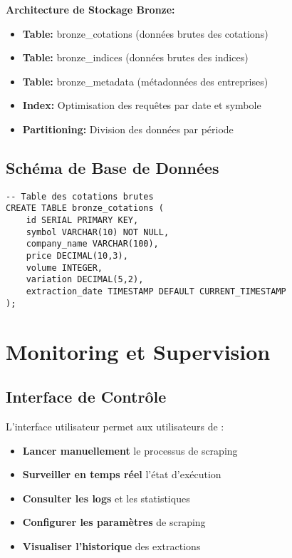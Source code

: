 \textbf{Architecture de Stockage Bronze:}
\begin{itemize}
    \item \textbf{Table:} bronze\_cotations (données brutes des cotations)
    \item \textbf{Table:} bronze\_indices (données brutes des indices)
    \item \textbf{Table:} bronze\_metadata (métadonnées des entreprises)
    \item \textbf{Index:} Optimisation des requêtes par date et symbole
    \item \textbf{Partitioning:} Division des données par période
\end{itemize}

\subsection{Schéma de Base de Données}

\begin{verbatim}
-- Table des cotations brutes
CREATE TABLE bronze_cotations (
    id SERIAL PRIMARY KEY,
    symbol VARCHAR(10) NOT NULL,
    company_name VARCHAR(100),
    price DECIMAL(10,3),
    volume INTEGER,
    variation DECIMAL(5,2),
    extraction_date TIMESTAMP DEFAULT CURRENT_TIMESTAMP
);
\end{verbatim}

\section{Monitoring et Supervision}

\subsection{Interface de Contrôle}

L'interface utilisateur permet aux utilisateurs de :

\begin{itemize}
    \item \textbf{Lancer manuellement} le processus de scraping
    \item \textbf{Surveiller en temps réel} l'état d'exécution
    \item \textbf{Consulter les logs} et les statistiques
    \item \textbf{Configurer les paramètres} de scraping
    \item \textbf{Visualiser l'historique} des extractions
\end{itemize}

